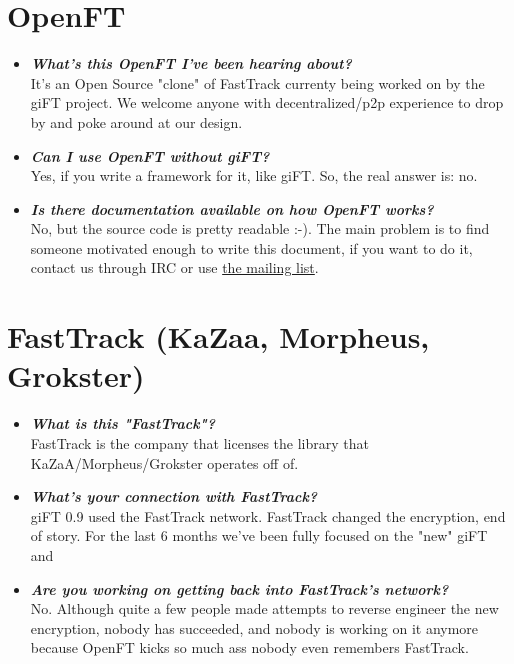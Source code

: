 \documentclass[10pt]{article}
\newcommand{\question}[1]{\item\textbf{\emph{#1}}}
\begin{document}
\section{OpenFT} 
\begin{itemize}

\question {What's this OpenFT I've been hearing about?}\\
It's an Open Source "clone" of FastTrack currenty being worked on by the giFT
project. We welcome anyone with decentralized/p2p experience to drop by and
poke around at our design. 
 
\question {Can I use OpenFT without giFT?}\\
Yes, if you write a framework for it, like giFT. So, the real answer is: no.

\question {Is there documentation available on how OpenFT works?}\\
No, but the source code is pretty readable :-). The main problem is to find
someone motivated enough to write this document, if you want to do it, contact
us through IRC or use
\href{http://lists.sourceforge.net/lists/listinfo/gift-openft}{the mailing
list}.

\end{itemize}
 
\section{FastTrack (KaZaa, Morpheus, Grokster)}
\begin{itemize}

\question {What is this "FastTrack"?}\\
FastTrack is the company that licenses the library that KaZaA/Morpheus/Grokster
operates off of. 
 
\question {What's your connection with FastTrack?}\\
giFT 0.9 used the FastTrack network. FastTrack changed the encryption, end of
story. For the last 6 months we've been fully focused on the "new" giFT and

\question {Are you working on getting back into FastTrack's network?}\\
No. Although quite a few people made attempts to reverse engineer the new
encryption, nobody has succeeded, and nobody is working on it anymore because
OpenFT kicks so much ass nobody even remembers FastTrack. 
 
\end{itemize}
\end{document}
